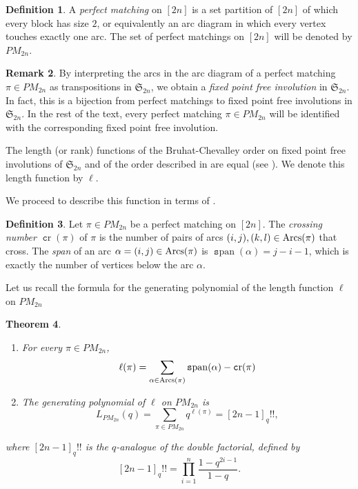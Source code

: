 \documentclass[11pt]{amsart}
\newcommand{\symm}[1]{\mathfrak{S}_{#1}}
\numberwithin{figure}{section}
\DeclareMathOperator{\arcs}{\text Arcs}
\DeclareMathOperator{\cro}{\mathtt cr}
\DeclareMathOperator{\aspan}{\mathtt span}
\theoremstyle{plain}
\newtheorem{theorem}{Theorem}[section]
\theoremstyle{definition}
\newtheorem{definition}[theorem]{Definition}
\newtheorem{remark}[theorem]{Remark}
\begin{document}
\begin{definition}
A {\em perfect matching} on $[2n]$ is a set partition of $[2n]$ of which every block has size $2$, or equivalently an arc diagram in which every vertex touches exactly one arc. 
The set of perfect matchings on $[2n]$ will be denoted by $PM_{2n}$.
\end{definition}

\begin{remark}
By interpreting the arcs in the arc diagram of a perfect matching $\pi\in PM_{2n}$ as transpositions in $\symm{2n}$, we obtain a {\em fixed point free involution} in $\symm{2n}.$
In fact, this is a  bijection from perfect matchings to fixed point free involutions in $\symm{2n}$. In the rest of the text, every perfect matching $\pi\in PM_{2n}$ will be identified with the corresponding fixed point free involution.
\end{remark}

 
The length (or rank) functions of the Bruhat-Chevalley order on fixed point free involutions of $\symm{2n}$ and of the order described in \cite{DeodharSrinivasanStatisticOnInvolutions} are equal (see \cite[Corollary~4]{LexicographicShellabilityBruhatInvolutions}). We denote this length function by $\ell$. 


We proceed to describe this function in terms of \cite{DeodharSrinivasanStatisticOnInvolutions}.
\begin{definition}
Let $\pi \in PM_{2n}$ be a perfect matching on $[2n]$. The {\em crossing number}  $\cro(\pi)$ of $\pi$ is the number of pairs of arcs $(i,j), (k,l)\in \arcs(\pi)$ that cross.
The {\em span} of an arc $\alpha=(i,j)\in\arcs(\pi)$ 
	is $\aspan(\alpha)=j-i-1$, which is exactly the number of vertices below the arc $\alpha$.
\end{definition}
Let us recall the formula for the generating polynomial of the length function $\ell$ on $PM_{2n}$
\begin{theorem}\cite[Theorem~1.3]{DeodharSrinivasanStatisticOnInvolutions}\label{thm:length_generating_formula}
\begin{enumerate}
	\item	For every $\pi\in PM_{2n}$, 
	$$ 
	\ell(\pi)=\sum_{\alpha\in\arcs(\pi)}\aspan(\alpha)-\cro(\pi)
	$$
	\item The generating polynomial of $\ell$ on $PM_{2n}$ is 
	$$L_{PM_{2n} }(q) 
	= \sum_{\pi\in PM_{2n}}q^{\ell(\pi)} = [2n-1]_q!!,$$
\end{enumerate}

where $[2n-1]_q!!$ is the {\em $q$-analogue of the double factorial}, defined by
    $$[2n-1]_q!!=\prod_{i=1}^n\frac{1-q^{2i-1}}{1-q}.$$
\end{theorem}
\end{document}
